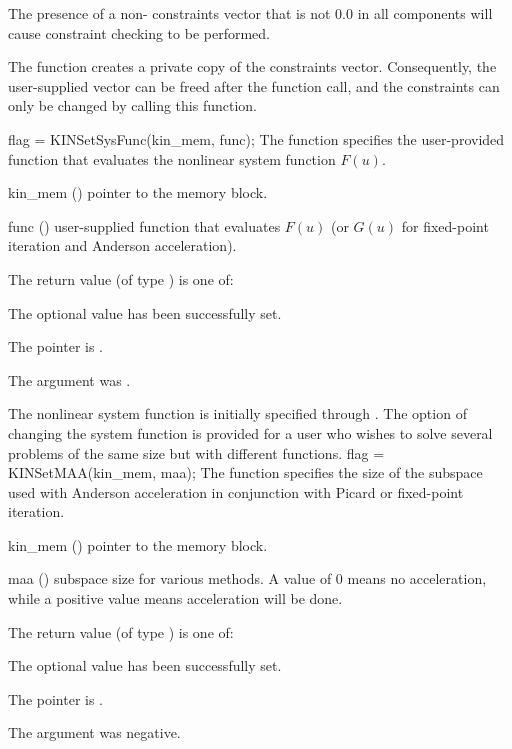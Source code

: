 {
  The presence of a non- constraints vector that is not $0.0$ in
  all components will cause constraint checking to be performed.

  The function creates a private copy of the constraints vector. Consequently,
  the user-supplied vector can be freed after the function call, and
  the constraints can only be changed by calling this function.
}
{
flag = KINSetSysFunc(kin\_mem, func);
}
{
  The function  specifies the user-provided function
  that evaluates the nonlinear system function $F(u)$.
}
{
  \begin{args}
  \item[kin\_mem] ()
    pointer to the {\kinsol} memory block.
  \item[func] ()
    user-supplied function that evaluates $F(u)$ (or $G(u)$ for fixed-point 
    iteration and Anderson acceleration).
  \end{args}
}
{
  The return value  (of type ) is one of:
  \begin{args}
  \item[\Id{KIN\_SUCCESS}] 
    The optional value has been successfully set.
  \item[\Id{KIN\_MEM\_NULL}]
    The  pointer is .
  \item[\Id{KIN\_ILL\_INPUT}]
    The argument  was .
  \end{args}
}
{
  The nonlinear system function is initially specified through .
  The option of changing the system function is provided for a user who wishes 
  to solve several problems of the same size but with different functions.
}
{
flag = KINSetMAA(kin\_mem, maa);
}
{
  The function  specifies the size of the subspace used with
  Anderson acceleration in conjunction with Picard or fixed-point iteration.
}
{
  \begin{args}
  \item[kin\_mem] ()
    pointer to the {\kinsol} memory block.
  \item[maa] ()
    subspace size for various methods.  A value of 0 means no acceleration,
    while a positive value means acceleration will be done.
  \end{args}
}
{
  The return value  (of type ) is one of:
  \begin{args}
  \item[\Id{KIN\_SUCCESS}] 
    The optional value has been successfully set.
  \item[\Id{KIN\_MEM\_NULL}]
    The  pointer is .
  \item[\Id{KIN\_ILL\_INPUT}]
    The argument  was negative.
  \end{args}
}

